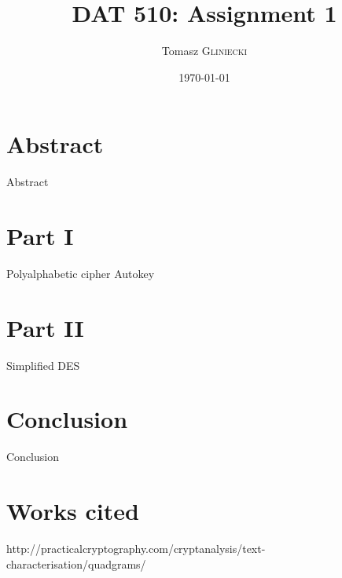 \documentclass{article}
\title{DAT 510: Assignment 1} %
\author{Tomasz \textsc{Gliniecki}} %
\date{\today} %
\begin{document}
\maketitle %



\section*{Abstract}
Abstract

\section*{Part I}

Polyalphabetic cipher
Autokey

\section*{Part II}
Simplified DES
\section*{Conclusion}
Conclusion
\section*{Works cited}
http://practicalcryptography.com/cryptanalysis/text-characterisation/quadgrams/
\end{document}
